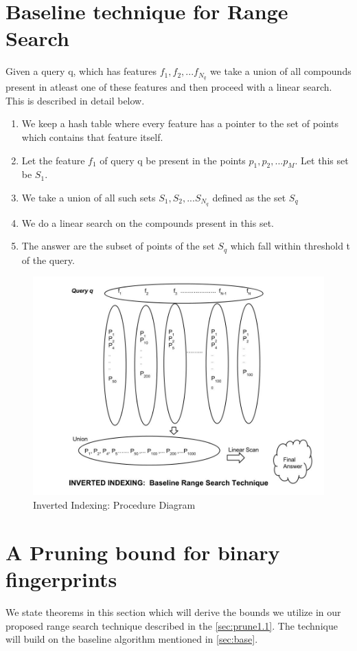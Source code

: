 \section{Baseline technique for Range Search}
\label{sec:base}
 Given a query q, which has features $f_1, f_2,...f_{N_q}$ we take a union of all compounds present in atleast one of these features and then proceed with a linear search. This is described in detail below.

\begin{enumerate}
	\item We keep a hash table where every feature has a pointer to the set of points which contains that feature itself.
	\item Let the feature $f_1$ of query q be present in the points $p_1,p_2,...p_M$. Let this set be $S_1$.
	\item We take a union of all such sets $S_1, S_2,...S_{N_q}$ defined as the set $S_q$
	\item We do a linear search on the compounds present in this set.
	\item The answer are the subset of points of the set $S_q$ which fall within threshold t of the query.	 
\end{enumerate}


\begin{figure}[ht]	
\centering
\includegraphics[width=1 \columnwidth]{img/image0c.jpg}
\caption{Inverted Indexing: Procedure Diagram}
\label{fig: invert}
\end{figure}




\section{A Pruning bound for binary fingerprints}
\label{sec:prune1}
We state theorems in this section which will derive the bounds we utilize in our proposed range search technique described in the \autoref{sec:prune1.1}. The technique will build on the baseline algorithm mentioned in \autoref{sec:base}.

